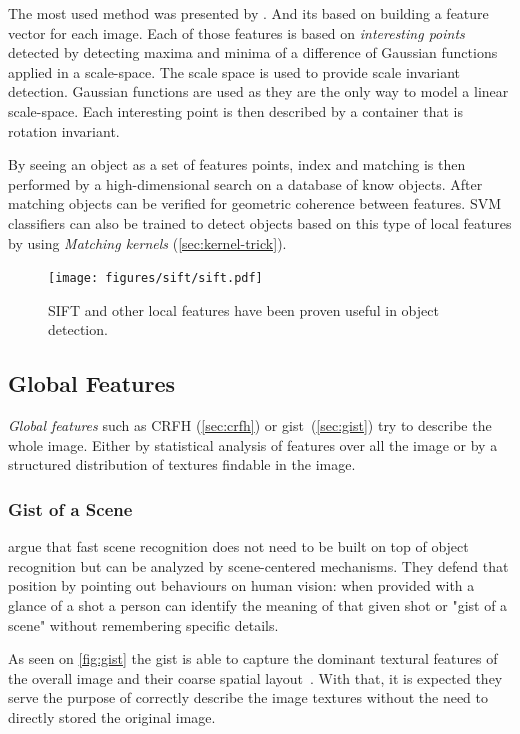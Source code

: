 The most used method was presented by \cite{lowe1999object}. And its based on
building a feature vector for each image. Each of those features is based on
\emph{interesting points} detected by detecting maxima and minima of a
difference of Gaussian functions applied in a scale-space.
The scale space is used to provide scale invariant detection. Gaussian functions
are used as they are the only way to model a linear scale-space.
Each interesting point is then described by a container that is rotation
invariant.

By seeing an object as a set of features points, index and matching is then
performed by a high-dimensional search on a database of know objects. After
matching objects can be verified for geometric coherence between features.
\Gls{SVM} classifiers can also be trained to detect objects based on this type
of local features by using \emph{Matching kernels} (\autoref{sec:kernel-trick}).

\begin{figure}[h]
    \centering
    \texttt{[image: figures/sift/sift.pdf]}
    \caption{{SIFT} and other local features have been proven useful in object
             detection.}
\end{figure}


\subsection{Global Features}
\emph{Global features} such as \gls{CRFH} (\autoref{sec:crfh}) or
{gist}~(\autoref{sec:gist}) try to describe the whole image. Either by
statistical analysis of features over all the image or by a structured
distribution of textures findable in the image.

\subsubsection*{Gist of a Scene}
\label{sec:gist}
\cite{oliva2006building} argue that fast scene recognition does not need to be
built on top of object recognition but can be analyzed by scene-centered
mechanisms.
They defend that position by pointing out behaviours on human vision:
when provided with a glance of a shot a person can identify the meaning of that
given shot or "gist of a scene" without remembering specific details.

As seen on \autoref{fig:gist} the gist is able to capture the dominant textural
features of the overall image and their coarse spatial layout~\citep{murphy2006object}.
With that, it is expected they serve the purpose of correctly describe the image
textures without the need to directly stored the original image.

